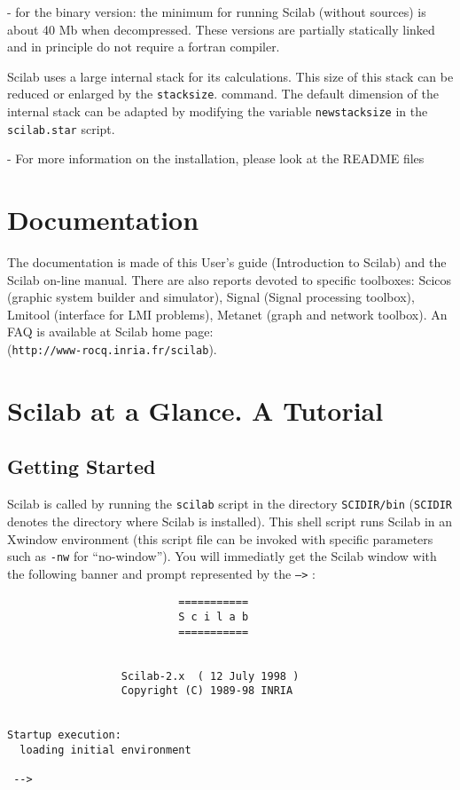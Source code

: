 - for the binary version: the minimum for running Scilab (without
sources) is about 40 Mb when decompressed.
These versions  are partially statically linked and in principle do not require a fortran compiler.

\label{stks}
Scilab uses a large internal stack for its calculations. This size
of this stack can be reduced or enlarged by the 
{\tt stacksize}.
command. The default dimension of the internal stack can be adapted
by modifying the variable {\tt newstacksize} in the {\tt scilab.star}
script.

- For more information on the installation, please look at the README files

\section{Documentation}

The documentation is made of this User's guide (Introduction to
Scilab) and the Scilab on-line manual. There are also
reports devoted to specific toolboxes: Scicos (graphic system builder
and simulator), Signal (Signal processing toolbox), Lmitool (interface for 
LMI problems), Metanet (graph and network toolbox). An FAQ is
available at Scilab home page:\\
(\verb!http://www-rocq.inria.fr/scilab!).

\section{Scilab at a Glance. A Tutorial}

\subsection{Getting Started}

Scilab is called by running the {\tt scilab} script in the 
directory {\tt SCIDIR/bin} ({\tt SCIDIR} denotes the directory 
where Scilab is installed).
This shell script  runs Scilab in an Xwindow environment (this 
script file can be invoked with
specific parameters such as \verb!-nw! for ``no-window'').
You will immediatly get the Scilab window with the following banner and 
prompt represented by the {\tt -->} : 


\bigskip

\begin{verbatim}
                           ===========
                           S c i l a b
                           ===========
 
 
                  Scilab-2.x  ( 12 July 1998 ) 
                  Copyright (C) 1989-98 INRIA 
 
 
Startup execution:
  loading initial environment
   
 -->

\end{verbatim}



